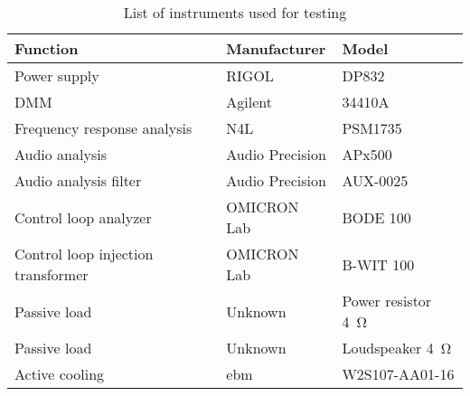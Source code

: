 \begin{table}[ht]
	\centering
	\begin{tabular}{@{}lll@{}}
		\toprule
		\textbf{Function} & \textbf{Manufacturer} & \textbf{Model} \\ \midrule
		Power supply & RIGOL & DP832 \\
		DMM & Agilent & 34410A \\
		Frequency response analysis & N4L & PSM1735 \\
		Audio analysis & Audio Precision & APx500 \\
		Audio analysis filter & Audio Precision & AUX-0025 \\
		Control loop analyzer & OMICRON Lab & BODE 100 \\
		Control loop injection transformer & OMICRON Lab & B-WIT 100 \\
		Passive load & Unknown & Power resistor \SI{4}{\ohm} \\
		Passive load & Unknown & Loudspeaker \SI{4}{\ohm} \\
		Active cooling & ebm & W2S107-AA01-16 \\ \bottomrule
	\end{tabular}
	\caption{List of instruments used for testing}
	\label{tab:instruments_hardware}
\end{table}
